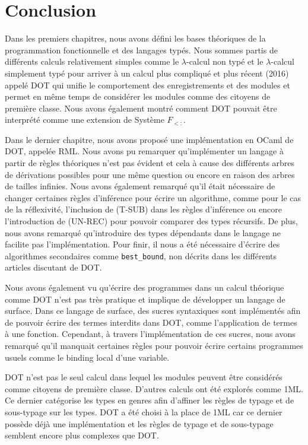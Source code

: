 \chapter*{Conclusion}

Dans les premiers chapitres, nous avons défini les bases théoriques de la
programmation fonctionnelle et des langages typés. Nous sommes partis de
différents calculs relativement simples comme le $\lambda$-calcul non typé et le
$\lambda$-calcul simplement typé pour arriver à un calcul plus compliqué et plus
récent (2016) appelé DOT qui unifie
le comportement des enregistrements et des modules et permet en même temps
de considérer les modules comme des citoyens de première classe. Nous
avons également montré comment DOT pouvait être interprété comme une extension
de Système $F_{<:}$.

Dans le dernier chapitre, nous avons proposé une implémentation en OCaml de
DOT, appelée RML. Nous avons pu remarquer qu'implémenter un langage à partir de règles
théoriques n'est pas évident et cela à cause des différents arbres de
dérivations possibles pour une même question ou encore en raison des arbres de
tailles infinies.
Nous avons également remarqué qu'il était nécessaire de changer certaines règles
d'inférence pour écrire un algorithme, comme pour le cas de la réflexivité,
l'inclusion de (T-SUB) dans les règles d'inférence ou encore l'introduction de
(UN-REC) pour pouvoir comparer des types récursifs.
De plus, nous avons remarqué qu'introduire des types dépendants dans le
langage ne facilite pas l'implémentation. Pour finir, il nous a été nécessaire
d'écrire des algorithmes secondaires comme \verb|best_bound|, non décrits dans
les différents articles discutant de DOT.

Nous avons également vu qu'écrire des programmes dans un calcul théorique comme
DOT n'est pas très pratique et implique de développer un langage de surface.
Dans ce langage de surface, des sucres syntaxiques sont implémentés afin de
pouvoir écrire des termes interdits dans DOT, comme l'application de termes à
une fonction. Cependant, à travers l'implémentation de ces sucres, nous avons
remarqué qu'il manquait certaines règles pour pouvoir écrire certains programmes
usuels comme le binding local d'une variable.

DOT n'est pas le seul calcul dans lequel les modules peuvent être considérés
comme citoyens de première classe. D'autres calculs ont été explorés comme
1ML\cite{1ml-paper}. Ce dernier catégorise les types en
genres\cite{tapl-higher-order-systems} afin d'affiner les règles de typage et
de sous-typage sur les types. DOT a été choisi à la place de 1ML car ce dernier possède
déjà une implémentation et les règles de typage et de sous-typage semblent
encore plus complexes que DOT.

